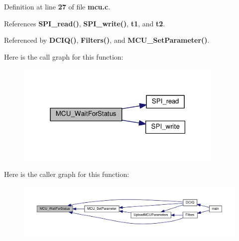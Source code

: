 Definition at line {\bf 27} of file {\bf mcu.\+c}.



References {\bf S\+P\+I\+\_\+read()}, {\bf S\+P\+I\+\_\+write()}, {\bf t1}, and {\bf t2}.



Referenced by {\bf D\+C\+I\+Q()}, {\bf Filters()}, and {\bf M\+C\+U\+\_\+\+Set\+Parameter()}.



Here is the call graph for this function\+:
\nopagebreak
\begin{figure}[H]
\begin{center}
\leavevmode
\includegraphics[width=283pt]{d1/d10/mcu_8h_a689b035d8dc0e958a2f8cf0dbe04f98d_cgraph}
\end{center}
\end{figure}




Here is the caller graph for this function\+:
\nopagebreak
\begin{figure}[H]
\begin{center}
\leavevmode
\includegraphics[width=350pt]{d1/d10/mcu_8h_a689b035d8dc0e958a2f8cf0dbe04f98d_icgraph}
\end{center}
\end{figure}


